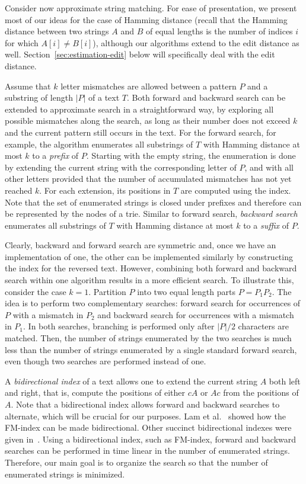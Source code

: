 \documentclass[12pt]{article}
\begin{document}
Consider now approximate string matching. For ease of presentation, we
present most of our ideas for the
case of Hamming distance
(recall that the Hamming distance between two strings $A$ and $B$ of equal
lengths is the number of indices $i$ for which $A[i] \neq B[i]$),
although our algorithms extend to the edit
distance as well. Section~\ref{sec:estimation-edit} below will
specifically deal with the edit distance.

Assume that $k$ letter mismatches are allowed between a pattern $P$ and
a substring of length $|P|$ of a text $T$.
Both forward and backward search can be extended to
approximate search in a straightforward way, by exploring all
possible mismatches along the search, as long as their number does
not exceed $k$ and the current pattern still occurs in the text.
For the forward search, for example, the algorithm enumerates all
substrings of $T$ with
Hamming distance at most $k$ to a \emph{prefix} of $P$.
Starting with the empty string, the enumeration 
is done by extending the current string with the corresponding letter
of $P$, and with all other letters provided that the number of accumulated
mismatches has not yet reached $k$. For each extension,
its positions in $T$ are computed using the index.
Note that the set of enumerated strings is closed under prefixes and
therefore can be represented by the nodes of a trie.
Similar to forward search, \emph{backward search}
enumerates all substrings of $T$
with Hamming distance at most $k$ to a \emph{suffix} of $P$.

Clearly, backward and forward search are symmetric and, once we have
an implementation of one, the other can be implemented similarly by constructing the index
for the reversed text. 
However, combining both forward and backward search within one algorithm
results in a more efficient search.
To illustrate this, consider the case $k=1$.
Partition $P$ into two equal length parts $P=P_1 P_2$.
The idea is to perform two complementary searches: forward search for
occurrences of $P$ with a mismatch in $P_2$ and backward search for
occurrences with a mismatch in $P_1$. In both searches, branching is
performed only after $|P|/2$ characters are matched. 
Then,
the number of strings enumerated by the
two searches is much less than the number of strings enumerated by a single
standard forward search, even though two searches are performed instead
of one.

A \emph{bidirectional index} of a text allows one to extend the current
string $A$ both left and right, that is, compute the positions of either
$cA$ or $Ac$ from the positions of $A$.
Note that a bidirectional
index allows forward and backward searches to alternate, which will be
crucial for our purposes. 
Lam et al.~\cite{LamLTWWY09} showed how the FM-index can be made
bidirectional. Other succinct bidirectional indexes were given
in~\cite{RussoEtAlAlgorithms09,SchnattingerOG12,BelazzouguiCKM13}.
Using a bidirectional index, such as FM-index, forward and backward searches can be
performed in time linear in the number of enumerated strings.
Therefore, our main goal is to organize the search so that the number
of enumerated strings is minimized.
\end{document}
